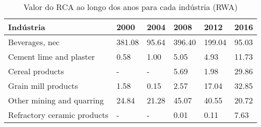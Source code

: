 \begin{table}
\centering
\caption{Valor do RCA ao longo dos anos para cada indústria (RWA)}
\begin{tabular}{p{6cm}p{1.5cm}p{1.5cm}p{1.5cm}p{1.5cm}p{1.5cm}}
\toprule
                  Indústria &   2000 &  2004 &   2008 &   2012 &  2016 \\
\midrule
             Beverages, nec & 381.08 & 95.64 & 396.40 & 199.04 & 95.03 \\
    Cement lime and plaster &   0.58 &  1.00 &   5.05 &   4.93 & 11.73 \\
            Cereal products &      - &     - &   5.69 &   1.98 & 29.86 \\
        Grain mill products &   1.58 &  0.15 &   2.57 &  17.04 & 32.85 \\
  Other mining and quarring &  24.84 & 21.28 &  45.07 &  40.55 & 20.72 \\
Refractory ceramic products &      - &     - &   0.01 &   0.11 &  7.63 \\
\bottomrule
\end{tabular}
\end{table}

